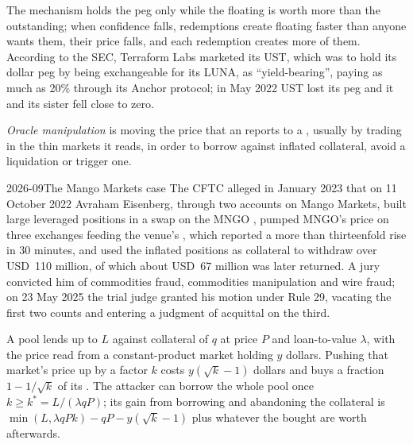 The mechanism holds the peg only while the floating  is worth more than the  outstanding; when confidence falls, redemptions create
floating  faster than anyone wants them, their price falls, and each redemption creates more of them. According to the SEC, Terraform Labs
marketed its  UST, which was to hold its dollar peg by being exchangeable for its  LUNA, as ``yield-bearing'', paying as much as 20\%
through its Anchor protocol; in May 2022 UST lost its peg and it and its sister  fell close to zero.

\begin{definition}\label{def:m3:defi-credit-and-leverage:oracle}
\emph{Oracle manipulation} is moving the price that an  reports to a , usually by trading in the thin
markets it reads, in order to borrow against inflated collateral, avoid a liquidation or trigger one.
\end{definition}

\begin{dated}{2026-09}{The Mango Markets case}\label{dat:m3:defi-credit-and-leverage:mango}
The CFTC alleged in January 2023 that on 11 October 2022 Avraham Eisenberg, through two accounts on Mango Markets, built large leveraged positions in a
swap on the MNGO , pumped MNGO's price on three exchanges feeding the venue's , which reported a more than thirteenfold rise in 30 minutes,
and used the inflated positions as collateral to withdraw over USD~110 million, of which about USD~67 million was later returned. A jury convicted him of
commodities fraud, commodities manipulation and wire fraud; on 23 May 2025 the trial judge granted his motion under Rule 29, vacating the first two
counts and entering a judgment of acquittal on the third.
\end{dated}

\begin{proposition}\label{prop:m3:defi-credit-and-leverage:pump}
A pool lends up to $L$ against collateral of $q$  at price $P$ and loan-to-value $\lambda$, with the price read from a constant-product market
holding $y$ dollars. Pushing that market's price up by a factor $k$ costs $y(\sqrt{k} - 1)$ dollars and buys a fraction $1 - 1/\sqrt{k}$ of its .
The attacker can borrow the whole pool once $k \ge k^* = L/(\lambda qP)$; its gain from borrowing and abandoning the collateral is
$\min(L, \lambda qPk) - qP - y(\sqrt{k} - 1)$ plus whatever the  bought are worth afterwards.
\end{proposition}

